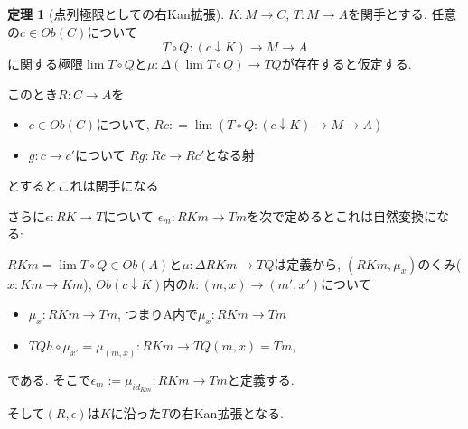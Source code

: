 \documentclass[dvipdfmx,a4paper,11pt]{report}
\theoremstyle{definition}
\newtheorem{thm}{定理}
\begin{document}
 \begin{tcolorbox}
 [colback = white, colframe = green!35!black, fonttitle = \bfseries,breakable = true]
\begin{thm}[点列極限としての右Kan拡張]
\label{thm-Kan-extension}
$K : M \to C$, $T : M \to A$を関手とする.
任意の$c \in Ob(C)$について
$$
T \circ Q : (c \downarrow K) \to M \to A
$$
に関する極限$\lim T\circ Q$と$\mu: \Delta (\lim T\circ Q) \to TQ$が存在すると仮定する.

このとき$R : C \to A$を
\begin{itemize}
\item $c \in Ob(C)$について, $Rc : = \lim (T \circ Q : (c \downarrow K) \to M \to A)$
\item $g : c \to c'$について $Rg : Rc \to Rc'$となる射
\end{itemize}
とするとこれは関手になる

さらに$\epsilon : RK \to T$について
$\epsilon_{m} : RKm \to Tm$を次で定めるとこれは自然変換になる: 

$RKm =\lim T\circ Q \in Ob(A)$と$\mu: \Delta RKm \to TQ$は定義から, 
$(RKm , \mu_{x})$のくみ($x : Km \to Km $), $Ob(c \downarrow K )$内の$h : (m,x)\to (m',x')$について
\begin{itemize}
\item $\mu_{x} : RKm \to Tm  $, つまりA内で$\mu_{x} :  RKm\to Tm $
\item $ TQ h  \circ \mu_{x'} = \mu_{(m,x)} :RKm \to  TQ(m,x) =Tm$, 
\end{itemize}
である. そこで$\epsilon_{m} := \mu_{ id_{Km}} : RKm \to Tm$と定義する.



そして$(R,\epsilon)$は$K$に沿った$T$の右Kan拡張となる. 

\end{thm}
\end{tcolorbox}
\end{document}
